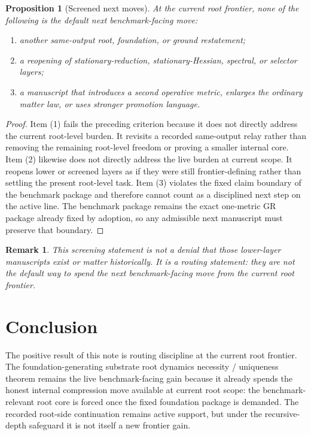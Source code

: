 \documentclass[11pt]{article}
\newtheorem{proposition}{Proposition}
\newtheorem{remark}{Remark}
\begin{document}
\begin{proposition}[Screened next moves]
At the current root frontier, none of the following is the default next benchmark-facing move:
\begin{enumerate}
    \item another same-output root, foundation, or ground restatement;
    \item a reopening of stationary-reduction, stationary-Hessian, spectral, or selector layers;
    \item a manuscript that introduces a second operative metric, enlarges the ordinary matter law, or uses stronger promotion language.
\end{enumerate}
\end{proposition}

\begin{proof}
Item (1) fails the preceding criterion because it does not directly address the current root-level burden. It revisits a recorded same-output relay rather than removing the remaining root-level freedom or proving a smaller internal core. Item (2) likewise does not directly address the live burden at current scope. It reopens lower or screened layers as if they were still frontier-defining rather than settling the present root-level task. Item (3) violates the fixed claim boundary of the benchmark package and therefore cannot count as a disciplined next step on the active line. The benchmark package remains the exact one-metric GR package already fixed by adoption, so any admissible next manuscript must preserve that boundary.
\end{proof}

\begin{remark}
This screening statement is not a denial that those lower-layer manuscripts exist or matter historically. It is a routing statement: they are not the default way to spend the next benchmark-facing move from the current root frontier.
\end{remark}

\section{Conclusion}

The positive result of this note is routing discipline at the current root frontier. The foundation-generating substrate root dynamics necessity / uniqueness theorem remains the live benchmark-facing gain because it already spends the honest internal compression move available at current root scope: the benchmark-relevant root core is forced once the fixed foundation package is demanded. The recorded root-side continuation remains active support, but under the recursive-depth safeguard it is not itself a new frontier gain.
\end{document}
